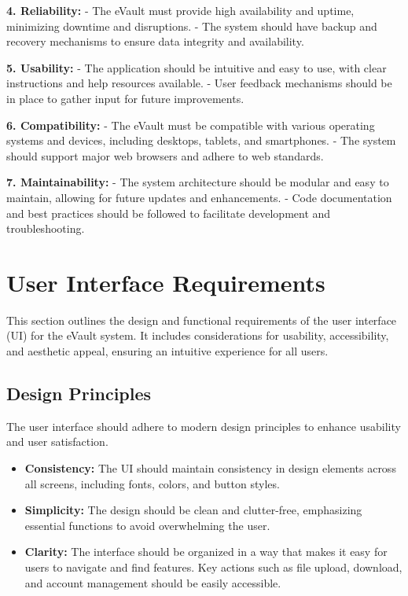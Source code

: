 \documentclass[12pt,a4paper]{report}
\begin{document}
\textbf{4. Reliability:}
   - The eVault must provide high availability and uptime, minimizing downtime and disruptions.
   - The system should have backup and recovery mechanisms to ensure data integrity and availability.

\textbf{5. Usability:}
   - The application should be intuitive and easy to use, with clear instructions and help resources available.
   - User feedback mechanisms should be in place to gather input for future improvements.

\textbf{6. Compatibility:}
   - The eVault must be compatible with various operating systems and devices, including desktops, tablets, and smartphones.
   - The system should support major web browsers and adhere to web standards.

\textbf{7. Maintainability:}
   - The system architecture should be modular and easy to maintain, allowing for future updates and enhancements.
   - Code documentation and best practices should be followed to facilitate development and troubleshooting.

   \section{User Interface Requirements}

   This section outlines the design and functional requirements of the user interface (UI) for the eVault system. It includes considerations for usability, accessibility, and aesthetic appeal, ensuring an intuitive experience for all users.
   
   \subsection{Design Principles}
   The user interface should adhere to modern design principles to enhance usability and user satisfaction.
   \begin{itemize}
       \item \textbf{Consistency:} The UI should maintain consistency in design elements across all screens, including fonts, colors, and button styles.
       \item \textbf{Simplicity:} The design should be clean and clutter-free, emphasizing essential functions to avoid overwhelming the user.
       \item \textbf{Clarity:} The interface should be organized in a way that makes it easy for users to navigate and find features. Key actions such as file upload, download, and account management should be easily accessible.
   \end{itemize}
   
\end{document}
